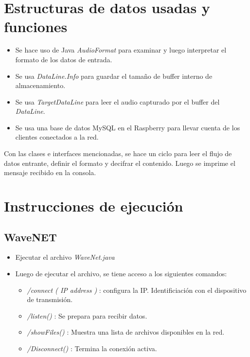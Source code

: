 \documentclass{article}
\begin{document}
\section{Estructuras de datos usadas y funciones}
\begin{itemize}
  \item Se hace uso de Java \emph{AudioFormat} para examinar y luego interpretar el formato de los datos de entrada.
  \item Se usa \emph{DataLine.Info} para guardar el tama\~no de buffer interno de almacenamiento.
  \item Se usa \emph{TargetDataLine} para leer el audio capturado por el buffer del \emph{DataLine}.
  \item Se usa una base de datos MySQL en el Raspberry para llevar cuenta de los clientes conectados a la red.
\end{itemize}

Con las clases e interfaces mencionadas, se hace un ciclo para leer el flujo de datos entrante, definir el formato y decifrar el contenido. Luego se imprime el mensaje recibido en la consola.

\section{Instrucciones de ejecuci\'on}
\subsection{WaveNET}
\begin{itemize}
  \item Ejecutar el archivo \emph{WaveNet.java}
  \item Luego de ejecutar el archivo, se tiene acceso a los siguientes comandos:
  \begin{itemize}
    \item \emph{/connect ( IP address )} : configura la IP. Identificiaci\'on con el dispositivo de transmisi\'on.
    \item \emph{/listen()} : Se prepara para recibir datos.
    \item \emph{/showFiles()} : Muestra una lista de archivos disponibles en la red.
    \item \emph{/Disconnect()} : Termina la conexi\'on activa.
  \end{itemize}
\end{itemize}
\end{document}
